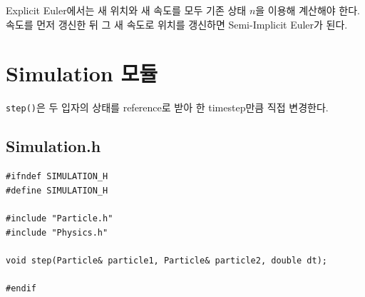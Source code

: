 \documentclass[11pt,a4paper]{article}
\begin{document}
\begin{importantbox}
Explicit Euler에서는 새 위치와 새 속도를 모두 기존 상태 $n$을 이용해 계산해야 한다. 속도를 먼저 갱신한 뒤 그 새 속도로 위치를 갱신하면 Semi-Implicit Euler가 된다.
\end{importantbox}

\section{Simulation 모듈}
\texttt{step()}은 두 입자의 상태를 reference로 받아 한 timestep만큼 직접 변경한다.

\subsection{Simulation.h}
\begin{lstlisting}
#ifndef SIMULATION_H
#define SIMULATION_H

#include "Particle.h"
#include "Physics.h"

void step(Particle& particle1, Particle& particle2, double dt);

#endif
\end{lstlisting}
\end{document}
